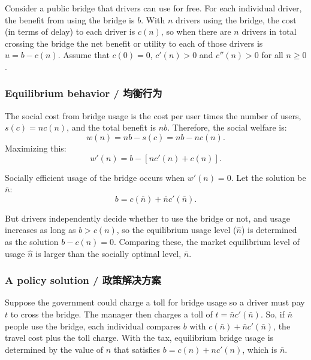 \begin{original}
Consider a public bridge that drivers can use for free. For each individual driver, the benefit from using the bridge is $b$. With $n$ drivers using the bridge, the cost (in terms of delay) to each driver is $c(n)$, so when there are $n$ drivers in total crossing the bridge the net benefit or utility to each of those drivers is $u = b - c(n)$. Assume that $c(0) = 0$, $c'(n) > 0$ and $c''(n) > 0$ for all $n \ge 0$.

\subsubsection{Equilibrium behavior / 均衡行为}

The social cost from bridge usage is the cost per user times the number of users, $s(c) = n c(n)$, and the total benefit is $n b$. Therefore, the social welfare is:
\[
w(n) = n b - s(c) = n b - n c(n).
\]
Maximizing this:
\[
w'(n) = b - [n c'(n) + c(n)].
\]

Socially efficient usage of the bridge occurs when $w'(n) = 0$. Let the solution be $\bar{n}$:
\[
b = c(\bar{n}) + \bar{n} c'(\bar{n}). \tag{6.8}
\]

But drivers independently decide whether to use the bridge or not, and usage increases as long as $b > c(n)$, so the equilibrium usage level ($\hat{n}$) is determined as the solution $b - c(n) = 0$. Comparing these, the market equilibrium level of usage $\hat{n}$ is larger than the socially optimal level, $\bar{n}$.

\subsubsection{A policy solution / 政策解决方案}

Suppose the government could charge a toll for bridge usage so a driver must pay $t$ to cross the bridge. The manager then charges a toll of $t = \bar{n} c'(\bar{n})$. So, if $\bar{n}$ people use the bridge, each individual compares $b$ with $c(\bar{n}) + \bar{n} c'(\bar{n})$, the travel cost plus the toll charge. With the tax, equilibrium bridge usage is determined by the value of $n$ that satisfies $b = c(n) + n c'(n)$, which is $\bar{n}$.
\end{original}

